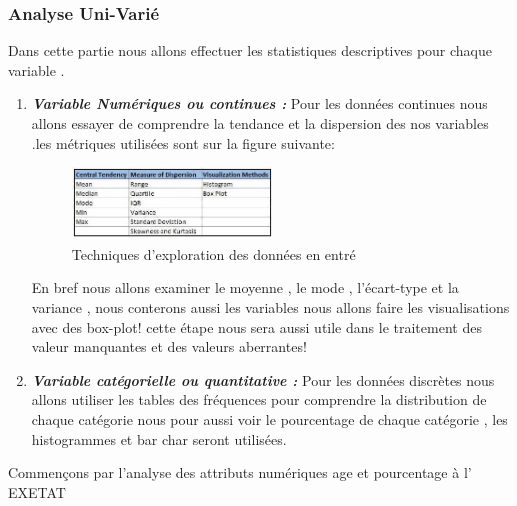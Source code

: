 \subsubsection{Analyse Uni-Varié}
Dans cette partie nous allons effectuer les statistiques descriptives pour chaque variable .
\begin{enumerate}
	\item
	\emph{\textbf{Variable Numériques ou continues : }}Pour les données continues nous
	allons essayer de comprendre la tendance et la dispersion des nos
	variables .les métriques utilisées sont sur la figure suivante: 
	\begin{figure}[ht]
		\centering
		\includegraphics[width=0.5\textwidth]{fig/DataExploration.png}
		\caption[Short caption]{Techniques d'exploration des données en entré }
		\label{fig:DataExplora}
	\end{figure}
	En bref nous allons examiner le moyenne , le mode , l'écart-type et la
	variance , nous conterons aussi les variables nous allons faire les
	visualisations avec des box-plot! cette étape nous sera aussi utile
	dans le traitement des valeur manquantes et des valeurs aberrantes!
	\item
	\emph{\textbf{Variable catégorielle ou quantitative :}} Pour les données discrètes nous
	allons utiliser  les tables des fréquences pour comprendre la distribution de
	chaque catégorie nous pour aussi voir le pourcentage de chaque
	catégorie , les histogrammes et bar char seront utilisées.
\end{enumerate}
Commençons par l'analyse des attributs numériques age et pourcentage à l' \ac{EXETAT} 
